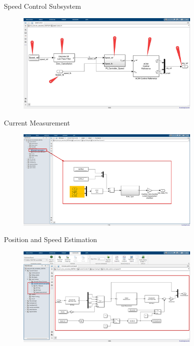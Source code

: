 \begin{frame}{Speed Control Subsystem}
	\begin{figure}
		\centering
		\includegraphics[width=0.8\textwidth]{sections/section3/images/simulation/speedControl/speedController.png}
	\end{figure}
\end{frame}

\begin{frame}{Current Measurement}
	\begin{figure}
		\centering
		\includegraphics[width=0.8\textwidth]{sections/section3/images/simulation/inputScaling/currentMeasurement.png}
	\end{figure}
\end{frame}

\begin{frame}{Position and Speed Estimation}
	\begin{figure}
		\centering
		\includegraphics[width=0.8\textwidth]{sections/section3/images/simulation/inputScaling/fluxObserver.png}
	\end{figure}
\end{frame}


